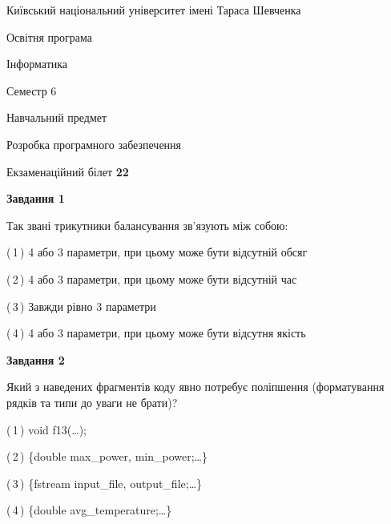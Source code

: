\documentclass[10pt, ukrainian]{article}
\begin{document}
{{\begin {small}\par
{ \center  Київський національний університет імені Тараса Шевченка \par}
{\parbox {5 cm}{Освітня програма \hfill}{\parbox {7 cm}{Інформатика \hfill}}\parbox {6 cm}{\hfill Семестр 6}}\par
{\parbox {5 cm} {Навчальний предмет \hfill}\parbox {7 cm}{Розробка програмного забезпечення \hfill}\parbox {6cm}{\hfill}\par}\vspace{-7pt} \end{small}}{\center Екзаменаційний білет \No \textbf
{ 22 }\par}}
{
\begin {large}
{\begin {center}\textbf{Завдання 1}\end {center}}\par
Так звані трикутники балансування зв'язують між собою:\par
\vspace{2mm}



(\,1\,) 4 або 3 параметри, при цьому може бути відсутній обсяг %



(\,2\,) 4 або 3 параметри, при цьому може бути відсутній час%



(\,3\,) Завжди рівно 3 параметри%



(\,4\,) 4 або 3 параметри, при цьому може бути відсутня якість%


{\begin {center}\textbf{Завдання 2}\end {center}}\par
Який з наведених фрагментів коду явно потребує поліпшення (форматування рядків та типи до уваги не брати)?\par
\vspace{2mm}



(\,1\,) void f13(…);%



(\,2\,) \{double max\_power, min\_power;…\} %



(\,3\,) \{fstream input\_file, output\_file;…\} %



(\,4\,) \{double avg\_temperature;…\} %



\end{large}}
\end{document}
